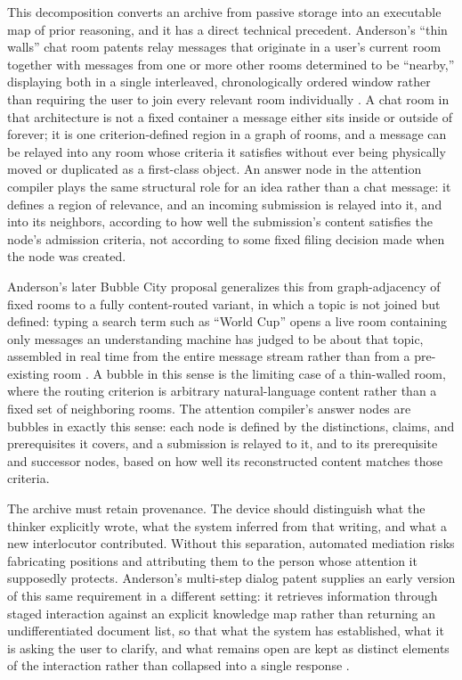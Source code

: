 \documentclass[11pt]{article}
\begin{document}
This decomposition converts an archive from passive storage into an executable map of prior reasoning, and it has a direct technical precedent. Anderson's ``thin walls'' chat room patents relay messages that originate in a user's current room together with messages from one or more other rooms determined to be ``nearby,'' displaying both in a single interleaved, chronologically ordered window rather than requiring the user to join every relevant room individually \cite{anderson2011thinwalls}. A chat room in that architecture is not a fixed container a message either sits inside or outside of forever; it is one criterion-defined region in a graph of rooms, and a message can be relayed into any room whose criteria it satisfies without ever being physically moved or duplicated as a first-class object. An answer node in the attention compiler plays the same structural role for an idea rather than a chat message: it defines a region of relevance, and an incoming submission is relayed into it, and into its neighbors, according to how well the submission's content satisfies the node's admission criteria, not according to some fixed filing decision made when the node was created.

Anderson's later Bubble City proposal generalizes this from graph-adjacency of fixed rooms to a fully content-routed variant, in which a topic is not joined but defined: typing a search term such as ``World Cup'' opens a live room containing only messages an understanding machine has judged to be about that topic, assembled in real time from the entire message stream rather than from a pre-existing room \cite{anderson2022bubblecity}. A bubble in this sense is the limiting case of a thin-walled room, where the routing criterion is arbitrary natural-language content rather than a fixed set of neighboring rooms. The attention compiler's answer nodes are bubbles in exactly this sense: each node is defined by the distinctions, claims, and prerequisites it covers, and a submission is relayed to it, and to its prerequisite and successor nodes, based on how well its reconstructed content matches those criteria.

The archive must retain provenance. The device should distinguish what the thinker explicitly wrote, what the system inferred from that writing, and what a new interlocutor contributed. Without this separation, automated mediation risks fabricating positions and attributing them to the person whose attention it supposedly protects. Anderson's multi-step dialog patent supplies an early version of this same requirement in a different setting: it retrieves information through staged interaction against an explicit knowledge map rather than returning an undifferentiated document list, so that what the system has established, what it is asking the user to clarify, and what remains open are kept as distinct elements of the interaction rather than collapsed into a single response \cite{anderson2009dialog}.
\end{document}
